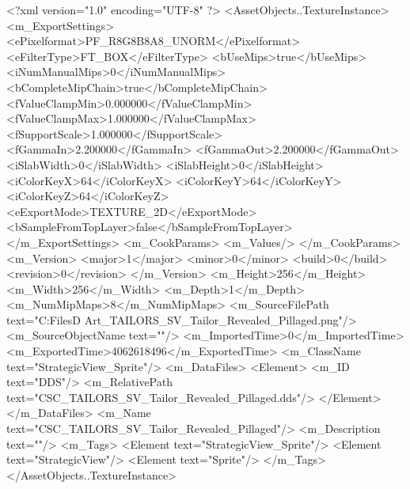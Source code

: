<?xml version="1.0" encoding="UTF-8" ?>
<AssetObjects..TextureInstance>
	<m_ExportSettings>
		<ePixelformat>PF_R8G8B8A8_UNORM</ePixelformat>
		<eFilterType>FT_BOX</eFilterType>
		<bUseMips>true</bUseMips>
		<iNumManualMips>0</iNumManualMips>
		<bCompleteMipChain>true</bCompleteMipChain>
		<fValueClampMin>0.000000</fValueClampMin>
		<fValueClampMax>1.000000</fValueClampMax>
		<fSupportScale>1.000000</fSupportScale>
		<fGammaIn>2.200000</fGammaIn>
		<fGammaOut>2.200000</fGammaOut>
		<iSlabWidth>0</iSlabWidth>
		<iSlabHeight>0</iSlabHeight>
		<iColorKeyX>64</iColorKeyX>
		<iColorKeyY>64</iColorKeyY>
		<iColorKeyZ>64</iColorKeyZ>
		<eExportMode>TEXTURE_2D</eExportMode>
		<bSampleFromTopLayer>false</bSampleFromTopLayer>
	</m_ExportSettings>
	<m_CookParams>
		<m_Values/>
	</m_CookParams>
	<m_Version>
		<major>1</major>
		<minor>0</minor>
		<build>0</build>
		<revision>0</revision>
	</m_Version>
	<m_Height>256</m_Height>
	<m_Width>256</m_Width>
	<m_Depth>1</m_Depth>
	<m_NumMipMaps>8</m_NumMipMaps>
	<m_SourceFilePath text="C:\Users\Shadow\Desktop\Working Files\2D Art\Quarters\Tailors\StrategicView\CSC_TAILORS_SV_Tailor_Revealed_Pillaged.png"/>
	<m_SourceObjectName text=""/>
	<m_ImportedTime>0</m_ImportedTime>
	<m_ExportedTime>4062618496</m_ExportedTime>
	<m_ClassName text="StrategicView_Sprite"/>
	<m_DataFiles>
		<Element>
			<m_ID text="DDS"/>
			<m_RelativePath text="CSC_TAILORS_SV_Tailor_Revealed_Pillaged.dds"/>
		</Element>
	</m_DataFiles>
	<m_Name text="CSC_TAILORS_SV_Tailor_Revealed_Pillaged"/>
	<m_Description text=""/>
	<m_Tags>
		<Element text="StrategicView_Sprite"/>
		<Element text="StrategicView"/>
		<Element text="Sprite"/>
	</m_Tags>
</AssetObjects..TextureInstance>


